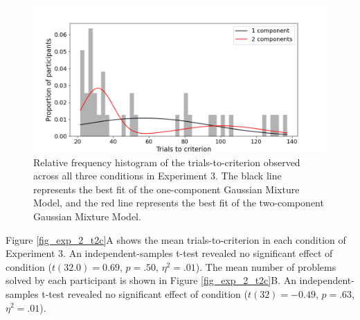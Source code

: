 \documentclass[doc, floatsintext]{apa7}
\begin{document}
\begin{figure}
  \centering
  \includegraphics[width=.8\textwidth]{../figures/fig_exp_2_gmm.png}
  \caption{
      Relative frequency histogram of the
      trials-to-criterion observed across all three
      conditions in Experiment 3. The black line represents
      the best fit of the one-component Gaussian Mixture
      Model, and the red line represents the best fit of the
      two-component Gaussian Mixture Model.
}
  \label{fig_gmm_hist_2}
\end{figure}

% 
% 

Figure \ref{fig_exp_2_t2c}A shows the mean
trials-to-criterion in each condition of Experiment 3. An
independent-samples t-test revealed no significant effect of
condition ($t(32.0)=0.69$, $p = .50$, $\eta^2 = .01$).  The
mean number of problems solved by each participant is shown
in Figure \ref{fig_exp_2_t2c}B. An independent-samples
t-test revealed no significant effect of condition ($t(32) =
-0.49$, $p = .63$, $\eta^2 = .01$).

% 

% 
\end{document}
